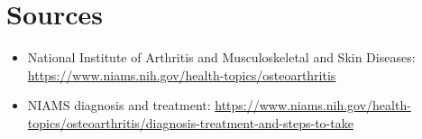 \section*{Sources}
\begin{itemize}
\item National Institute of Arthritis and Musculoskeletal and Skin Diseases: \url{https://www.niams.nih.gov/health-topics/osteoarthritis}
\item NIAMS diagnosis and treatment: \url{https://www.niams.nih.gov/health-topics/osteoarthritis/diagnosis-treatment-and-steps-to-take}
\end{itemize}
